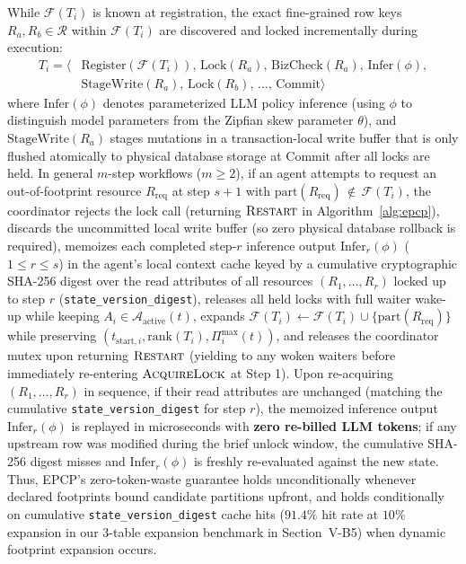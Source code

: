 \documentclass[conference,10pt]{IEEEtran}
\begin{document}
While $\mathcal{F}(T_i)$ is known at registration, the exact fine-grained row keys $R_a, R_b \in \mathcal{R}$ within $\mathcal{F}(T_i)$ are discovered and locked incrementally during execution:
\begin{equation}
\label{eq:tx_model}
\begin{aligned}
T_i = \langle &\text{Register}(\mathcal{F}(T_i)),\, \text{Lock}(R_a),\, \text{BizCheck}(R_a),\, \text{Infer}(\phi), \\
&\text{StageWrite}(R_a),\, \text{Lock}(R_b),\, \dots,\, \text{Commit} \rangle
\end{aligned}
\end{equation}
where $\text{Infer}(\phi)$ denotes parameterized LLM policy inference (using $\phi$ to distinguish model parameters from the Zipfian skew parameter $\theta$), and $\text{StageWrite}(R_a)$ stages mutations in a transaction-local write buffer that is only flushed atomically to physical database storage at $\text{Commit}$ after all locks are held. In general $m$-step workflows ($m \ge 2$), if an agent attempts to request an out-of-footprint resource $R_{\text{req}}$ at step $s+1$ with $\text{part}(R_{\text{req}}) \,\notin\, \mathcal{F}(T_i)$, the coordinator rejects the lock call (returning $\textsc{Restart}$ in Algorithm~\ref{alg:epcp}), discards the uncommitted local write buffer (so zero physical database rollback is required), memoizes each completed step-$r$ inference output $\text{Infer}_r(\phi)$ ($1 \le r \le s$) in the agent's local context cache keyed by a cumulative cryptographic SHA-256 digest over the read attributes of all resources $(R_1, \dots, R_r)$ locked up to step $r$ (\texttt{state\_version\_digest}), releases all held locks with full waiter wake-up while keeping $A_i \in \mathcal{A}_{\text{active}}(t)$, expands $\mathcal{F}(T_i) \leftarrow \mathcal{F}(T_i) \cup \{\text{part}(R_{\text{req}})\}$ while preserving $(t_{\text{start},i}, \text{rank}(T_i), \Pi_i^{\max}(t))$, and releases the coordinator mutex upon returning $\textsc{Restart}$ (yielding to any woken waiters before immediately re-entering $\textsc{AcquireLock}$ at Step 1). Upon re-acquiring $(R_1, \dots, R_r)$ in sequence, if their read attributes are unchanged (matching the cumulative \texttt{state\_version\_digest} for step $r$), the memoized inference output $\text{Infer}_r(\phi)$ is replayed in microseconds with \textbf{zero re-billed LLM tokens}; if any upstream row was modified during the brief unlock window, the cumulative SHA-256 digest misses and $\text{Infer}_r(\phi)$ is freshly re-evaluated against the new state. Thus, EPCP's zero-token-waste guarantee holds unconditionally whenever declared footprints bound candidate partitions upfront, and holds conditionally on cumulative \texttt{state\_version\_digest} cache hits ($91.4\%$ hit rate at $10\%$ expansion in our 3-table expansion benchmark in Section~V-B5) when dynamic footprint expansion occurs.
\end{document}
